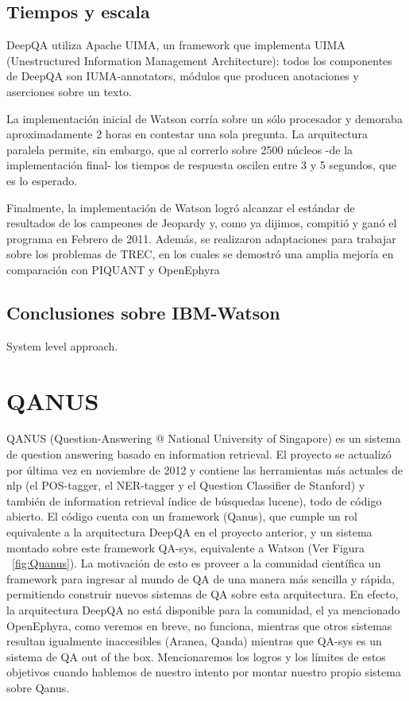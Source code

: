 \bigskip

\subsection{Tiempos y escala}

DeepQA utiliza Apache UIMA, un framework que implementa UIMA
(Unestructured Information Management Architecture): todos los
componentes de DeepQA son IUMA-annotators, m\'odulos que producen
anotaciones y aserciones sobre un texto.

La implementaci\'on inicial de Watson corr\'ia sobre un s\'olo
procesador y demoraba aproximadamente 2 horas en contestar una sola
pregunta. La arquitectura paralela permite, sin embargo, que al
correrlo sobre 2500 n\'ucleos -de la implementaci\'on final- los
tiempos de respuesta oscilen entre 3 y 5 segundos, que es lo esperado.

Finalmente, la implementaci\'on de Watson logr\'o alcanzar el est\'andar
de resultados de los campeones de Jeopardy y, como ya dijimos,
compiti\'o y gan\'o el programa en Febrero de 2011. Adem\'as, se
realizaron adaptaciones para trabajar sobre los problemas de TREC, en
los cuales se demostr\'o una amplia mejor\'ia en comparaci\'on con
PIQUANT y OpenEphyra


\bigskip

\subsection{Conclusiones sobre IBM-Watson}

System level approach.


\bigskip

\section{QANUS}

QANUS (Question-Answering @ National University of Singapore) es un
sistema de question answering basado en information retrieval. El
proyecto se actualiz\'o por \'ultima vez en noviembre de 2012 y
contiene las herramientas m\'as actuales de nlp (el POS-tagger, el
NER-tagger y el Question Classifier de Stanford) y tambi\'en de
information retrieval \'indice de b\'usquedas lucene), todo de c\'odigo
abierto. El c\'odigo cuenta con un framework (Qanus), que cumple un rol
equivalente a la arquitectura DeepQA en el proyecto anterior, y un
sistema montado sobre este framework QA-sys, equivalente a Watson (Ver Figura ~\ref{fig:Quanus}). La
motivaci\'on de esto es proveer a la comunidad cient\'ifica un
framework para ingresar al mundo de QA de una manera m\'as sencilla y
r\'apida, permitiendo construir nuevos sistemas de QA sobre esta
arquitectura. En efecto, la arquitectura DeepQA no est\'a disponible
para la comunidad, el ya mencionado OpenEphyra, como veremos en breve,
no funciona, mientras que otros sistemas resultan igualmente
inaccesibles (Aranea, Qanda) mientras que QA-sys es un sistema de QA
out of the box. Mencionaremos los logros y los l\'imites de estos
objetivos cuando hablemos de nuestro intento por montar nuestro propio
sistema sobre Qanus. 

